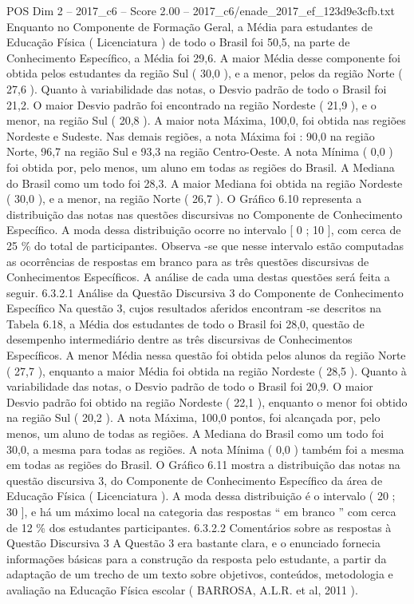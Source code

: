 \begin{textsample}{POS Dim 2 – 2017\_c6 – Score 2.00 – 2017\_c6/enade\_2017\_ef\_123d9e3cfb.txt}
Enquanto no Componente de Formação Geral, a Média para estudantes de Educação Física ( Licenciatura ) de todo o Brasil foi 50,5, na parte de Conhecimento Específico, a Média foi 29,6.
A maior Média desse componente foi obtida pelos estudantes da região Sul ( 30,0 ), e a menor, pelos da região Norte ( 27,6 ).
Quanto à variabilidade das notas, o Desvio padrão de todo o Brasil foi 21,2.
O maior Desvio padrão foi encontrado na região Nordeste ( 21,9 ), e o menor, na região Sul ( 20,8 ).
A maior nota Máxima, 100,0, foi obtida nas regiões Nordeste e Sudeste.
Nas demais regiões, a nota Máxima foi : 90,0 na região Norte, 96,7 na região Sul e 93,3 na região Centro-Oeste.
A nota Mínima ( 0,0 ) foi obtida por, pelo menos, um aluno em todas as regiões do Brasil.
A Mediana do Brasil como um todo foi 28,3.
A maior Mediana foi obtida na região Nordeste ( 30,0 ), e a menor, na região Norte ( 26,7 ).
O Gráfico 6.10 representa a distribuição das notas nas questões discursivas no Componente de Conhecimento Específico.
A moda dessa distribuição ocorre no intervalo [ 0 ; 10 ], com cerca de 25 \% do total de participantes.
Observa -se que nesse intervalo estão computadas as ocorrências de respostas em branco para as três questões discursivas de Conhecimentos Específicos.
A análise de cada uma destas questões será feita a seguir. 6.3.2.1 Análise da Questão Discursiva 3 do Componente de Conhecimento Específico Na questão 3, cujos resultados aferidos encontram -se descritos na Tabela 6.18, a Média dos estudantes de todo o Brasil foi 28,0, questão de desempenho intermediário dentre as três discursivas de Conhecimentos Específicos.
A menor Média nessa questão foi obtida pelos alunos da região Norte ( 27,7 ), enquanto a maior Média foi obtida na região Nordeste ( 28,5 ).
Quanto à variabilidade das notas, o Desvio padrão de todo o Brasil foi 20,9.
O maior Desvio padrão foi obtido na região Nordeste ( 22,1 ), enquanto o menor foi obtido na região Sul ( 20,2 ).
A nota Máxima, 100,0 pontos, foi alcançada por, pelo menos, um aluno de todas as regiões.
A Mediana do Brasil como um todo foi 30,0, a mesma para todas as regiões.
A nota Mínima ( 0,0 ) também foi a mesma em todas as regiões do Brasil.
O Gráfico 6.11 mostra a distribuição das notas na questão discursiva 3, do Componente de Conhecimento Específico da área de Educação Física ( Licenciatura ).
A moda dessa distribuição é o intervalo ( 20 ; 30 ], e há um máximo local na categoria das respostas “ em branco ” com cerca de 12 \% dos estudantes participantes. 6.3.2.2 Comentários sobre as respostas à Questão Discursiva 3 A Questão 3 era bastante clara, e o enunciado fornecia informações básicas para a construção da resposta pelo estudante, a partir da adaptação de um trecho de um texto sobre objetivos, conteúdos, metodologia e avaliação na Educação Física escolar ( BARROSA, A.L.R. et al, 2011 ).

\end{textsample}
